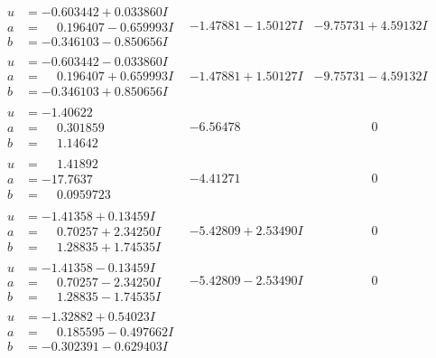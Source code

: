 \documentclass[1p]{elsarticle_modified}
\theoremstyle{definition}
\begin{document}
$$\begin{array}{c|c|c}
\begin{aligned}
u &= -0.603442 + 0.033860 I \\
a &= \phantom{-}0.196407 - 0.659993 I \\
b &= -0.346103 - 0.850656 I\end{aligned}
 & -1.47881 - 1.50127 I & -9.75731 + 4.59132 I \\ \hline\begin{aligned}
u &= -0.603442 - 0.033860 I \\
a &= \phantom{-}0.196407 + 0.659993 I \\
b &= -0.346103 + 0.850656 I\end{aligned}
 & -1.47881 + 1.50127 I & -9.75731 - 4.59132 I \\ \hline\begin{aligned}
u &= -1.40622\phantom{ +0.000000I} \\
a &= \phantom{-}0.301859\phantom{ +0.000000I} \\
b &= \phantom{-}1.14642\phantom{ +0.000000I}\end{aligned}
 & -6.56478\phantom{ +0.000000I} & \phantom{-0.000000 } 0 \\ \hline\begin{aligned}
u &= \phantom{-}1.41892\phantom{ +0.000000I} \\
a &= -17.7637\phantom{ +0.000000I} \\
b &= \phantom{-}0.0959723\phantom{ +0.000000I}\end{aligned}
 & -4.41271\phantom{ +0.000000I} & \phantom{-0.000000 } 0 \\ \hline\begin{aligned}
u &= -1.41358 + 0.13459 I \\
a &= \phantom{-}0.70257 + 2.34250 I \\
b &= \phantom{-}1.28835 + 1.74535 I\end{aligned}
 & -5.42809 + 2.53490 I & \phantom{-0.000000 } 0 \\ \hline\begin{aligned}
u &= -1.41358 - 0.13459 I \\
a &= \phantom{-}0.70257 - 2.34250 I \\
b &= \phantom{-}1.28835 - 1.74535 I\end{aligned}
 & -5.42809 - 2.53490 I & \phantom{-0.000000 } 0 \\ \hline\begin{aligned}
u &= -1.32882 + 0.54023 I \\
a &= \phantom{-}0.185595 - 0.497662 I \\
b &= -0.302391 - 0.629403 I\end{aligned}

\end{array}$$
\end{document}
